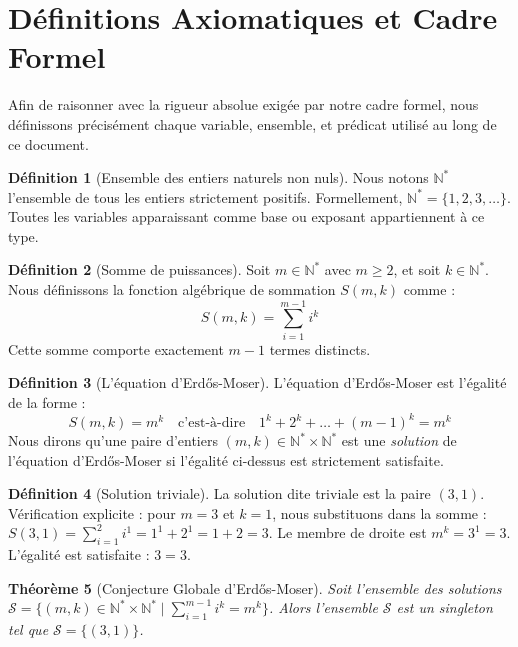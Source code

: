 \documentclass[11pt,a4paper,french]{article}
\newtheorem{theorem}{Théorème}[section]
\theoremstyle{definition}
\newtheorem{definition}[theorem]{Définition}
\theoremstyle{remark}
\begin{document}
\section{Définitions Axiomatiques et Cadre Formel}
\label{sec:defs}
Afin de raisonner avec la rigueur absolue exigée par notre cadre formel, nous définissons précisément chaque variable, ensemble, et prédicat utilisé au long de ce document.

\begin{definition}[Ensemble des entiers naturels non nuls]
Nous notons $\mathbb{N}^*$ l'ensemble de tous les entiers strictement positifs. Formellement, $\mathbb{N}^* = \{1, 2, 3, \dots\}$. Toutes les variables apparaissant comme base ou exposant appartiennent à ce type.
\end{definition}

\begin{definition}[Somme de puissances]
Soit $m \in \mathbb{N}^*$ avec $m \ge 2$, et soit $k \in \mathbb{N}^*$. Nous définissons la fonction algébrique de sommation $S(m, k)$ comme :
\begin{equation}
S(m, k) = \sum_{i=1}^{m-1} i^k
\end{equation}
Cette somme comporte exactement $m-1$ termes distincts.
\end{definition}

\begin{definition}[L'équation d'Erdős-Moser]
L'équation d'Erdős-Moser est l'égalité de la forme :
\begin{equation}
S(m, k) = m^k \quad \text{c'est-à-dire} \quad 1^k + 2^k + \dots + (m-1)^k = m^k
\end{equation}
Nous dirons qu'une paire d'entiers $(m, k) \in \mathbb{N}^* \times \mathbb{N}^*$ est une \textit{solution} de l'équation d'Erdős-Moser si l'égalité ci-dessus est strictement satisfaite.
\end{definition}

\begin{definition}[Solution triviale]
La solution dite triviale est la paire $(3, 1)$. Vérification explicite : pour $m=3$ et $k=1$, nous substituons dans la somme : $S(3, 1) = \sum_{i=1}^{2} i^1 = 1^1 + 2^1 = 1 + 2 = 3$. Le membre de droite est $m^k = 3^1 = 3$. L'égalité est satisfaite : $3 = 3$.
\end{definition}

\begin{theorem}[Conjecture Globale d'Erdős-Moser]
Soit l'ensemble des solutions $\mathcal{S} = \{ (m, k) \in \mathbb{N}^* \times \mathbb{N}^* \mid \sum_{i=1}^{m-1} i^k = m^k \}$. Alors l'ensemble $\mathcal{S}$ est un singleton tel que $\mathcal{S} = \{(3, 1)\}$.
\end{theorem}
\end{document}

